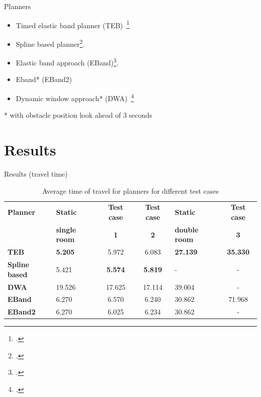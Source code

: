 \documentclass{beamer}
\begin{document}
\begin{frame}{\huge{Planners}}
    \begin{itemize}
        \item Timed elastic band planner (TEB)~\footcite{rosmann2015planning}
        \item Spline based planner\footcite{mercy2017spline}.
        \item Elastic band approach (EBand)\footcite{quinlan1993elastic}.
        \item Eband* (EBand2)
        \item Dynamic window approach* (DWA)~\footcite{fox1997dynamic}
    \end{itemize}
    \tiny{* with obstacle position look ahead of 3 seconds}
\end{frame}

\section{Results}
\begin{frame}[t]{\huge{Results (travel time)}}
\begin{table}[!htpb]
    \centering
    \begin{tabular}{p{1.5cm}p{1cm}ccp{1cm}c}\toprule
        \textbf{Planner} & \textbf{Static} & \textbf{Test case} & \textbf{Test case} & \textbf{Static} & \textbf{Test case} \\
                         & \textbf{single room} & \textbf{1} & \textbf{2} & \textbf{double room}       & \textbf{3} \\\toprule
        \textbf{TEB         } & \textbf{5.205}  & 5.972  & 6.083  & \textbf{27.139} & \textbf{35.330} \\\midrule
        \textbf{Spline based} & 5.421  & \textbf{5.574}  & \textbf{5.819}  & \--    & \--    \\\midrule
        \textbf{DWA         } & 19.526 & 17.625 & 17.114 & 39.004 & \-- \\\midrule
        \textbf{EBand       } & 6.270  & 6.570  & 6.240  & 30.862 & 71.968 \\\midrule
        \textbf{EBand2      } & 6.270  & 6.025  & 6.234  & 30.862 & \-- \\
        \bottomrule
    \end{tabular}
    \caption{Average time of travel for planners for different test cases}\label{tab:avg_time_planner_comp}
\end{table}
\end{frame}
\end{document}
